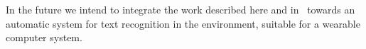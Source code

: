 \documentclass{elsart}   %
\begin{document}
In the future we intend to integrate the work described here and
in~\cite{justin} towards an automatic system for text recognition in the
environment, suitable for a wearable computer system. 




\end{document}
